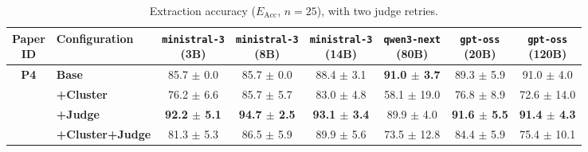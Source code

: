 \begin{table}[htbp]
    \centering
    \small
    \setlength{\tabcolsep}{4pt}
    \caption{Extraction accuracy ($E_{\text{Acc}}$, $n=25$), with two judge retries.}
    \begin{tabular}{c|l|cccccc}
        \toprule
        \makecell{\textbf{Paper} \\ \textbf{ID}} & \textbf{Configuration}& \makecell{\texttt{ministral-3} \\ (3B)} & \makecell{\texttt{ministral-3} \\ (8B)} & \makecell{\texttt{ministral-3} \\ (14B)} & \makecell{\texttt{qwen3-next} \\ (80B)} & \makecell{\texttt{gpt-oss} \\ (20B)} & \makecell{\texttt{gpt-oss} \\ (120B)} \\
        \hline
        
        \multirow{4}{*}{\textbf{P4}} 
          & \textbf{Base}& 85.7 $\pm$ 0.0 & 85.7 $\pm$ 0.0 & 88.4 $\pm$ 3.1 & \textbf{91.0 $\pm$ 3.7} & 89.3 $\pm$ 5.9 & 91.0 $\pm$ 4.0 \\
          & \textbf{+Cluster}& 76.2 $\pm$ 6.6 & 85.7 $\pm$ 5.7 & 83.0 $\pm$ 4.8 & 58.1 $\pm$ 19.0 & 76.8 $\pm$ 8.9 & 72.6 $\pm$ 14.0 \\
          & \textbf{+Judge}& \textbf{92.2 $\pm$ 5.1} & \textbf{94.7 $\pm$ 2.5} & \textbf{93.1 $\pm$ 3.4} & 89.9 $\pm$ 4.0 & \textbf{91.6 $\pm$ 5.5} & \textbf{91.4 $\pm$ 4.3} \\
          & \textbf{+Cluster+Judge}& 81.3 $\pm$ 5.3 & 86.5 $\pm$ 5.9 & 89.9 $\pm$ 5.6 & 73.5 $\pm$ 12.8 & 84.4 $\pm$ 5.9 & 75.4 $\pm$ 10.1 \\
        \hline
        
        \bottomrule
    \end{tabular}
    \label{tab:results_p4}
\end{table}